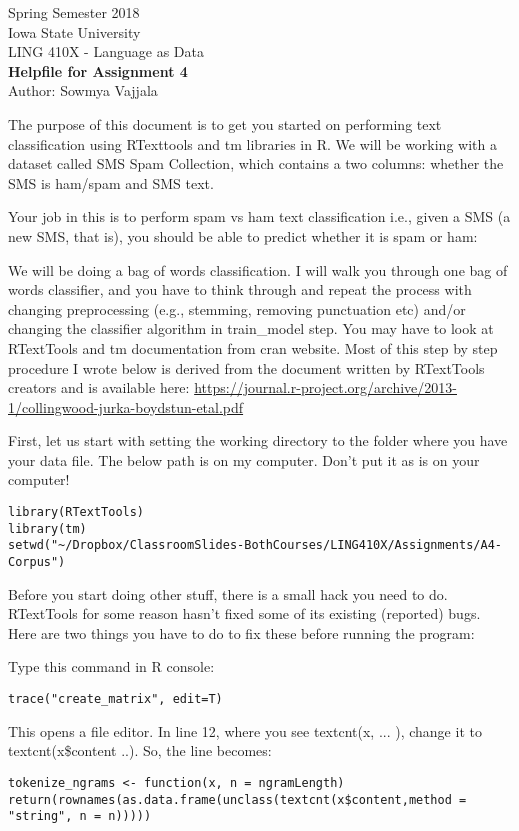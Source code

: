 \documentclass[11pt,a4paper]{article}
\begin{document}
\begin{center}
  Spring Semester 2018 \\ Iowa State University\\[3ex]
  {\large LING 410X - Language as Data}\\[3ex]
  \textbf{Helpfile for Assignment 4}
  \\ Author: Sowmya Vajjala
\end{center}

The purpose of this document is to get you started on performing text classification using RTexttools and tm libraries in R. We will be working with a dataset called SMS Spam Collection, which contains a two columns: whether the SMS is ham/spam and SMS text.

Your job in this is to perform spam vs ham text classification i.e., given a SMS (a new SMS, that is), you should be able to predict whether it is spam or ham:

We will be doing a bag of words classification. I will walk you through one bag of words classifier, and you have to think through and repeat the process with changing preprocessing (e.g., stemming, removing punctuation etc) and/or changing the classifier algorithm in train\_model step. You may have to look at RTextTools and tm documentation from cran website. Most of this step by step procedure I wrote below is derived from the document written by RTextTools creators and is available here: \url{https://journal.r-project.org/archive/2013-1/collingwood-jurka-boydstun-etal.pdf}

First, let us start with setting the working directory to the folder where you have your data file. The below path is on my computer. Don't put it as is on your computer!

\begin{lstlisting}
library(RTextTools)
library(tm)
setwd("~/Dropbox/ClassroomSlides-BothCourses/LING410X/Assignments/A4-Corpus")
\end{lstlisting}

Before you start doing other stuff, there is a small hack you need to do. RTextTools for some reason hasn't fixed some of its existing (reported) bugs. Here are two things you have to do to fix these before running the program:

Type this command in R console: 
\begin{lstlisting}
trace("create_matrix", edit=T)
\end{lstlisting}

This opens a file editor. In line 12, where you see textcnt(x, ... ), change it to textcnt(x\$content ..). So, the line becomes: 
\begin{lstlisting}
tokenize_ngrams <- function(x, n = ngramLength) return(rownames(as.data.frame(unclass(textcnt(x$content,method = "string", n = n)))))
\end{lstlisting}
\end{document}
